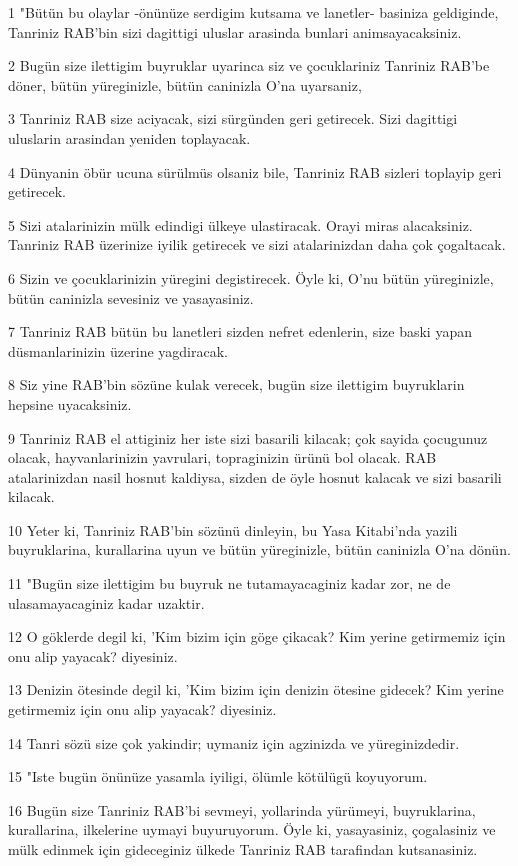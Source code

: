 \par 1 "Bütün bu olaylar -önünüze serdigim kutsama ve lanetler- basiniza geldiginde, Tanriniz RAB'bin sizi dagittigi uluslar arasinda bunlari animsayacaksiniz.
\par 2 Bugün size ilettigim buyruklar uyarinca siz ve çocuklariniz Tanriniz RAB'be döner, bütün yüreginizle, bütün caninizla O'na uyarsaniz,
\par 3 Tanriniz RAB size aciyacak, sizi sürgünden geri getirecek. Sizi dagittigi uluslarin arasindan yeniden toplayacak.
\par 4 Dünyanin öbür ucuna sürülmüs olsaniz bile, Tanriniz RAB sizleri toplayip geri getirecek.
\par 5 Sizi atalarinizin mülk edindigi ülkeye ulastiracak. Orayi miras alacaksiniz. Tanriniz RAB üzerinize iyilik getirecek ve sizi atalarinizdan daha çok çogaltacak.
\par 6 Sizin ve çocuklarinizin yüregini degistirecek. Öyle ki, O'nu bütün yüreginizle, bütün caninizla sevesiniz ve yasayasiniz.
\par 7 Tanriniz RAB bütün bu lanetleri sizden nefret edenlerin, size baski yapan düsmanlarinizin üzerine yagdiracak.
\par 8 Siz yine RAB'bin sözüne kulak verecek, bugün size ilettigim buyruklarin hepsine uyacaksiniz.
\par 9 Tanriniz RAB el attiginiz her iste sizi basarili kilacak; çok sayida çocugunuz olacak, hayvanlarinizin yavrulari, topraginizin ürünü bol olacak. RAB atalarinizdan nasil hosnut kaldiysa, sizden de öyle hosnut kalacak ve sizi basarili kilacak.
\par 10 Yeter ki, Tanriniz RAB'bin sözünü dinleyin, bu Yasa Kitabi'nda yazili buyruklarina, kurallarina uyun ve bütün yüreginizle, bütün caninizla O'na dönün.
\par 11 "Bugün size ilettigim bu buyruk ne tutamayacaginiz kadar zor, ne de ulasamayacaginiz kadar uzaktir.
\par 12 O göklerde degil ki, 'Kim bizim için göge çikacak? Kim yerine getirmemiz için onu alip yayacak? diyesiniz.
\par 13 Denizin ötesinde degil ki, 'Kim bizim için denizin ötesine gidecek? Kim yerine getirmemiz için onu alip yayacak? diyesiniz.
\par 14 Tanri sözü size çok yakindir; uymaniz için agzinizda ve yüreginizdedir.
\par 15 "Iste bugün önünüze yasamla iyiligi, ölümle kötülügü koyuyorum.
\par 16 Bugün size Tanriniz RAB'bi sevmeyi, yollarinda yürümeyi, buyruklarina, kurallarina, ilkelerine uymayi buyuruyorum. Öyle ki, yasayasiniz, çogalasiniz ve mülk edinmek için gideceginiz ülkede Tanriniz RAB tarafindan kutsanasiniz.

